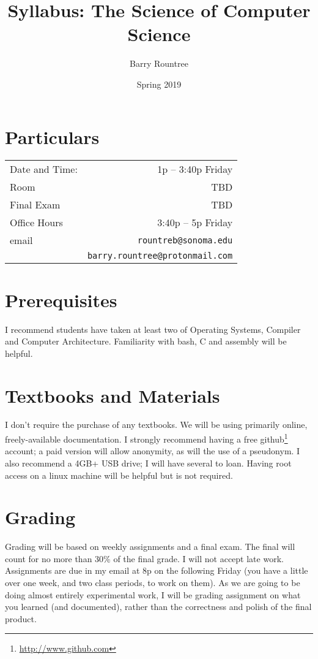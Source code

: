 \documentclass{tufte-handout}
\title{Syllabus:  The Science of Computer Science}
\author{Barry Rountree}
\date{Spring 2019}
\begin{document}
\maketitle%

\section{Particulars}
\begin{tabular*}{0.75\textwidth}{l r}
	Date and Time:  & 1p -- 3:40p Friday	\\
	Room		& TBD			\\
	Final Exam	& TBD			\\
	Office Hours	& 3:40p -- 5p Friday	\\
	email		& \texttt{rountreb@sonoma.edu} \\
			& \texttt{barry.rountree@protonmail.com} \\
\end{tabular*}

\section{Prerequisites}
I recommend students have taken at least two of Operating Systems, Compiler and
Computer Architecture.  Familiarity with bash, C and assembly will be helpful.

\section{Textbooks and Materials}
I don't require the purchase of any textbooks.  We will be using primarily online,
freely-available documentation.  I strongly recommend having a free 
github\footnote{\url{http://www.github.com}} account;
a paid version will allow anonymity, as will the use of a pseudonym.  I also 
recommend a 4GB+ USB drive; I will have several to loan.  Having root access on a 
linux machine will be helpful but is not required.

\section{Grading}
Grading will be based on weekly assignments and a final exam.  The final will count
for no more than 30\% of the final grade.  I will not accept late work.  Assignments
are due in my email at 8p on the following Friday (you have a little over one week,
and two class periods, to work on them).  As we are going to be doing almost entirely
experimental work, I will be grading assignment on what you learned (and documented),
rather than the correctness and polish of the final product.
\end{document}

